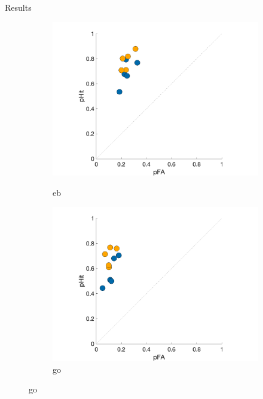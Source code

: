 \documentclass[10pt,xcolor=svgnames]{beamer} %
\begin{document}
\begin{frame}{Results}
    \begin{figure}
        \centering
        \begin{subfigure}{0.32\textwidth}
            \centering
            \includegraphics[width=\textwidth]{results/eb_roc.png}
            \label{figure:eb_roc}
            \caption{eb}
        \end{subfigure}
        \hfill
        \begin{subfigure}{0.32\textwidth}
            \centering
            \includegraphics[width=\textwidth]{results/go_roc.png}
            \caption{go}
            \label{figure:go_roc}
        \end{subfigure}

\end{figure}
\end{frame}
\end{document}
